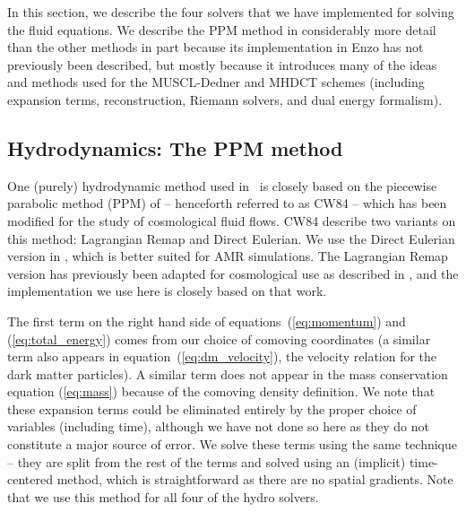 In this section, we describe the four solvers that we have implemented
for solving the fluid equations.  We describe the PPM method in
considerably more detail than the other methods in part because its
implementation in Enzo has not previously been described, but mostly
because it introduces many of the ideas and methods used for the
MUSCL-Dedner and MHDCT schemes (including expansion terms,
reconstruction, Riemann solvers, and dual energy formalism).

\subsection{Hydrodynamics: The PPM method}
\label{sec.hydro.ppm}

One (purely) hydrodynamic method used in \enzo\ is closely based on
the piecewise parabolic method (PPM) of \citet{1984JCoPh..54..174C} --
henceforth referred to as CW84 -- which has been modified for the
study of cosmological fluid flows.  CW84 describe two variants on this
method: Lagrangian Remap and Direct Eulerian.  We use the Direct
Eulerian version in \enzo, which is better suited for AMR simulations.
The Lagrangian Remap version has previously been adapted for
cosmological use as described in \citet{1995CoPhC..89..149B}, and the
implementation we use here is closely based on that work.

The first term on the right hand side of equations~(\ref{eq:momentum})
and (\ref{eq:total_energy}) comes from our choice of comoving
coordinates (a similar term also appears in
equation~(\ref{eq:dm_velocity}), the velocity relation for the dark
matter particles).  A similar term does not appear in the mass
conservation equation (\ref{eq:mass}) because of the comoving density
definition.  We note that these expansion terms could be eliminated
entirely by the proper choice of variables (including time), although
we have not done so here as they do not constitute a major source of
error.  We solve these terms using the same technique -- they are
split from the rest of the terms and solved using an (implicit)
time-centered method, which is straightforward as there are no spatial
gradients.  Note that we use this method for all four of the hydro
solvers.

